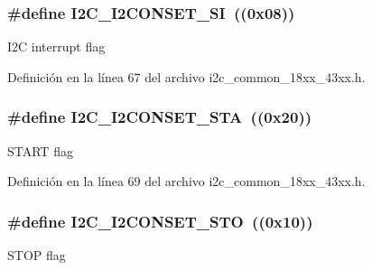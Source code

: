 \subsubsection[{\texorpdfstring{I2\+C\+\_\+\+I2\+C\+O\+N\+S\+E\+T\+\_\+\+SI}{I2C_I2CONSET_SI}}]{\setlength{\rightskip}{0pt plus 5cm}\#define I2\+C\+\_\+\+I2\+C\+O\+N\+S\+E\+T\+\_\+\+SI~((0x08))}\hypertarget{group___i2_c__18_x_x__43_x_x_gaa447cd2686805ef8009fc599144ee3dc}{}\label{group___i2_c__18_x_x__43_x_x_gaa447cd2686805ef8009fc599144ee3dc}
I2C interrupt flag 

Definición en la línea 67 del archivo i2c\+\_\+common\+\_\+18xx\+\_\+43xx.\+h.

\subsubsection[{\texorpdfstring{I2\+C\+\_\+\+I2\+C\+O\+N\+S\+E\+T\+\_\+\+S\+TA}{I2C_I2CONSET_STA}}]{\setlength{\rightskip}{0pt plus 5cm}\#define I2\+C\+\_\+\+I2\+C\+O\+N\+S\+E\+T\+\_\+\+S\+TA~((0x20))}\hypertarget{group___i2_c__18_x_x__43_x_x_gabaad3370eb35644c135d40f06adbbba0}{}\label{group___i2_c__18_x_x__43_x_x_gabaad3370eb35644c135d40f06adbbba0}
S\+T\+A\+RT flag 

Definición en la línea 69 del archivo i2c\+\_\+common\+\_\+18xx\+\_\+43xx.\+h.

\subsubsection[{\texorpdfstring{I2\+C\+\_\+\+I2\+C\+O\+N\+S\+E\+T\+\_\+\+S\+TO}{I2C_I2CONSET_STO}}]{\setlength{\rightskip}{0pt plus 5cm}\#define I2\+C\+\_\+\+I2\+C\+O\+N\+S\+E\+T\+\_\+\+S\+TO~((0x10))}\hypertarget{group___i2_c__18_x_x__43_x_x_gaae292803a059b84eac20ab8777d113af}{}\label{group___i2_c__18_x_x__43_x_x_gaae292803a059b84eac20ab8777d113af}
S\+T\+OP flag 

